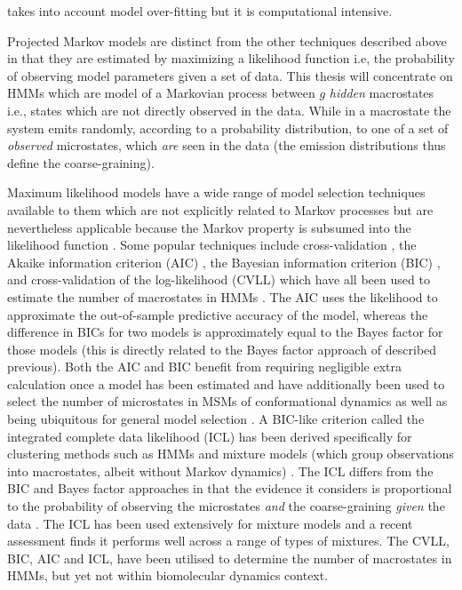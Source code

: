 takes into account model over-fitting \cite{bacalladoBayesianComparisonMarkov2009a} but it is computational intensive.  

Projected Markov models are distinct from the other techniques described above in that they are estimated by maximizing a likelihood function \cite{wuProjectedMetastableMarkov2015, noeProjectedHiddenMarkov2013a} i.e, the probability of observing model parameters given a set of data.  This thesis will concentrate on HMMs which are model of a Markovian process between $g$ \emph{hidden} macrostates i.e., states which are not directly observed in the data. While in a macrostate the system emits randomly, according to a probability distribution, to one of a set of \emph{observed} microstates, which \emph{are} seen in the data (the emission distributions thus define the coarse-graining). 

Maximum likelihood models have a wide range of model selection techniques available to them which are not explicitly related to Markov processes but are nevertheless applicable because the Markov property is subsumed into the likelihood function \cite[chapter 7]{friedman2001elements}\cite{milliganExaminationProceduresDetermining1985, mclachlanFiniteMixtureModels2000}.  Some popular techniques include cross-validation \cite{arlotSurveyCrossvalidationProcedures2009}, the Akaike information criterion (AIC) \cite{akaikeInformationTheoryExtension1998}, the  Bayesian information criterion (BIC) \cite{schwarzEstimatingDimensionModel1978a}, and cross-validation of the log-likelihood (CVLL) which have all  been used to estimate the number of macrostates in HMMs \cite{celeuxSelectingHiddenMarkov2008}. The AIC uses the likelihood to approximate the out-of-sample predictive accuracy of the model, whereas the difference in BICs for two models is approximately equal to the Bayes factor for those models (this is directly related to the Bayes factor approach of \cite{bacalladoBayesianComparisonMarkov2009a} described previous). Both the AIC and BIC benefit from requiring negligible extra calculation once a model has been estimated and have additionally been used to select the number of microstates in MSMs of conformational dynamics \cite{mcgibbonStatisticalModelSelection2014a} as well as being ubiquitous for general model selection \cite[chapter 7]{friedman2001elements}.  A BIC-like criterion called the integrated complete data likelihood (ICL) \cite{biernackiAssessingMixtureModel2000a} has been derived specifically for clustering methods such as HMMs and mixture models (which  group observations into macrostates, albeit without Markov dynamics) \cite{mclachlanFiniteMixtureModels2000}. The ICL differs from the BIC and Bayes factor approaches in that the evidence it considers is proportional to the probability of observing the microstates \emph{and} the coarse-graining \emph{given} the data \cite{biernackiAssessingMixtureModel2000a,mclachlanFiniteMixtureModels2000}.  The ICL has been used extensively \cite{mclachlanFiniteMixtureModels2000} for mixture models and a recent assessment \cite{brochadoDeterminingNumberComponents2020} finds it performs well across a range of types of mixtures. The CVLL, BIC, AIC and ICL, have been utilised to determine the number of macrostates in HMMs, but yet not within biomolecular dynamics context.  


